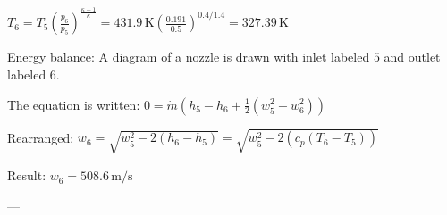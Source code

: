 \( T_6 = T_5 \left( \frac{p_6}{p_5} \right)^{\frac{\kappa - 1}{\kappa}} = 431.9 \, \text{K} \left( \frac{0.191}{0.5} \right)^{0.4 / 1.4} = 327.39 \, \text{K} \)  

Energy balance:  
A diagram of a nozzle is drawn with inlet labeled \( 5 \) and outlet labeled \( 6 \).  

The equation is written:  
\( 0 = \dot{m} \left( h_5 - h_6 + \frac{1}{2} \left( w_5^2 - w_6^2 \right) \right) \)  

Rearranged:  
\( w_6 = \sqrt{w_5^2 - 2 \left( h_6 - h_5 \right)} = \sqrt{w_5^2 - 2 \left( c_p \left( T_6 - T_5 \right) \right)} \)  

Result:  
\( w_6 = 508.6 \, \text{m/s} \)  

---